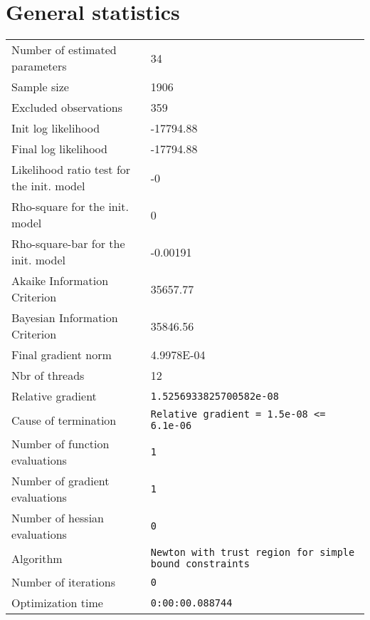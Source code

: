 



\section{General statistics}
\begin{tabular}{ll}
Number of estimated parameters & 34 \\
Sample size & 1906 \\
Excluded observations & 359 \\
Init log likelihood & -17794.88 \\
Final log likelihood & -17794.88 \\
Likelihood ratio test for the init. model & -0 \\
Rho-square for the init. model & 0 \\
Rho-square-bar for the init. model & -0.00191 \\
Akaike Information Criterion & 35657.77 \\
Bayesian Information Criterion & 35846.56 \\
Final gradient norm & 4.9978E-04 \\
Nbr of threads & 12 \\
Relative gradient & \verb$1.5256933825700582e-08$ \\
Cause of termination & \verb$Relative gradient = 1.5e-08 <= 6.1e-06$ \\
Number of function evaluations & \verb$1$ \\
Number of gradient evaluations & \verb$1$ \\
Number of hessian evaluations & \verb$0$ \\
Algorithm & \verb$Newton with trust region for simple bound constraints$ \\
Number of iterations & \verb$0$ \\
Optimization time & \verb$0:00:00.088744$ \\
\end{tabular}

